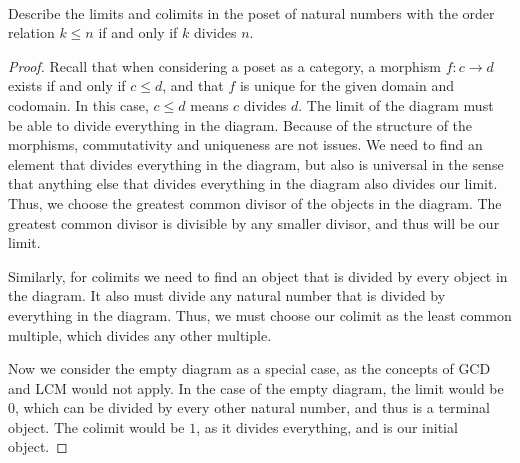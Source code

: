 \documentclass[../../main]{subfiles}
\author{Teddy Weinberg}
\begin{document}
\paragraph{}
\begin{exercise}
Describe the limits and colimits in the poset of natural numbers with the order
relation $k \le n$ if and only if $k$ divides $n$.
\end{exercise}

\begin{proof}
Recall that when considering a poset as a category, a morphism $f\colon c
\rightarrow d$ exists if and only if $c \le d$, and that $f$ is unique for the
given domain and codomain.  In this case, $c \le d$ means $c$ divides $d$.  The
limit of the diagram must be able to divide everything in the diagram.  Because
of the structure of the morphisms, commutativity and uniqueness are not issues.
We need to find an element that divides everything in the diagram, but also is
universal in the sense that anything else that divides everything in the
diagram also divides our limit.  Thus, we choose the greatest common divisor of
the objects in the diagram.  The greatest common divisor is divisible by any
smaller divisor, and thus will be our limit. 


Similarly, for colimits we need to find an object that is divided by every
object in the diagram.  It also must divide any natural number that is divided
by everything in the diagram.  Thus, we must choose our colimit as the least
common multiple, which divides any other multiple.  

Now we consider the empty diagram as a special case, as the concepts of GCD and
LCM would not apply.  In the case of the empty diagram, the limit would be $0$,
which can be divided by every other natural number, and thus is a terminal
object. The colimit would be $1$, as it divides everything, and is our initial
object.
\end{proof}
\end{document}
